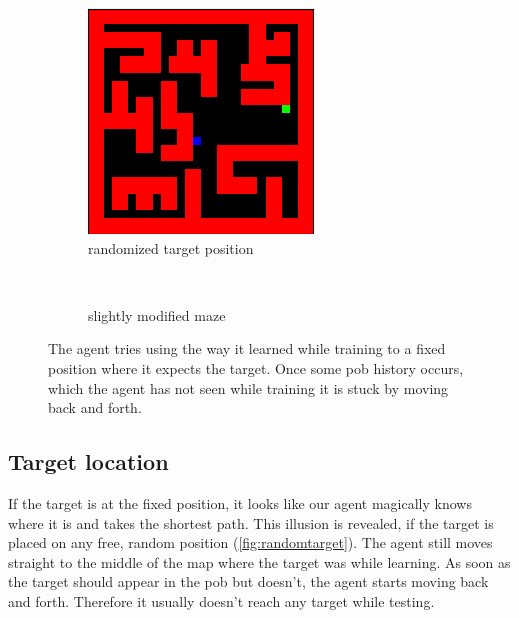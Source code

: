 \documentclass[a4paper,14pt]{article}
\begin{document}
\begin{figure}
    \centering
    \begin{subfigure}[b]{0.3\textwidth}
        \includegraphics[width=\textwidth]{random_target}
        \caption{randomized target position}
        \label{fig:randomtarget}
    \end{subfigure}
    ~ %
    \begin{subfigure}[b]{0.3\textwidth}
        \caption{slightly modified maze}
        \label{fig:othermaze}
    \end{subfigure}
    \caption{The agent tries using the way it learned while training to a fixed
      position where it expects the target. Once some pob history occurs, which the agent has
      not seen while training it is stuck by moving back and forth.}\label{fig:generalization}
\end{figure}

\subsection{Target location}

If the target is at the fixed position, it looks like our agent magically knows
where it is and takes the shortest path.
This illusion is revealed, if the target is placed on any free, random position (\autoref{fig:randomtarget}).
The agent still moves straight to the middle of the map where the target was
while learning. As soon as the target should appear in the pob but doesn't, the
agent starts moving back and forth.
Therefore it usually doesn't reach any target while testing.
\end{document}

